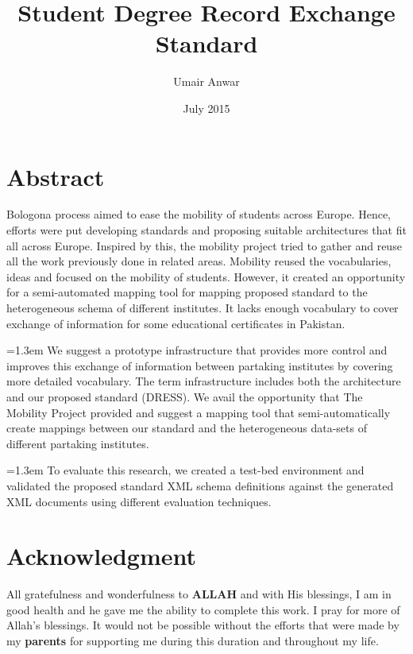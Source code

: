 \documentclass[12pt,a4paper,oneside]{book}
\title{Student Degree Record Exchange Standard}
\author{Umair Anwar}
\date{July 2015}
\begin{document}
\maketitle


\chapter*{Abstract}

 Bologona process aimed to ease the mobility of students across Europe. Hence, efforts were put developing standards and proposing suitable architectures that fit all across Europe. Inspired by this, the mobility project tried to gather and reuse all the work previously done in related areas. Mobility reused the vocabularies, ideas and focused on the mobility of students. However, it created an opportunity for a semi-automated mapping tool for mapping proposed standard to the heterogeneous schema of different institutes. It lacks enough vocabulary to cover exchange of information for some educational certificates in Pakistan.\par
{\parskip=1.3em We suggest a prototype infrastructure that provides more control and improves this exchange of information between partaking institutes by covering more detailed vocabulary. The term infrastructure includes both the architecture and our proposed standard (DRESS). We avail the opportunity that The Mobility Project provided and suggest a mapping tool that semi-automatically create mappings between our standard and the heterogeneous data-sets of different partaking institutes.\par} 
{\parskip=1.3em To evaluate this research, we created a test-bed environment and validated the proposed standard XML schema definitions against the generated XML documents using different evaluation techniques. \par} 

\certificateoforiginality
\chapter*{Acknowledgment}
All gratefulness and wonderfulness to {\bfseries ALLAH} and with His blessings, I am in good health and he gave me the ability to complete this work. I pray for more of Allah's blessings. It would not be possible without the efforts that were made by my {\bfseries parents} for supporting me during this duration and throughout my life. \\
\end{document}
